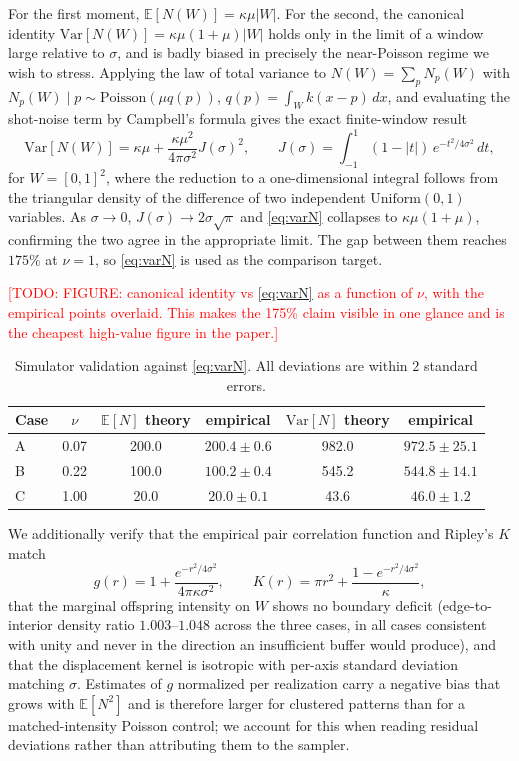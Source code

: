 \documentclass[11pt,letterpaper]{article}
\newcommand{\1}{\mathds{1}}
\newcommand{\todo}[1]{\textcolor{red}{[TODO: #1]}}
\newcommand{\todo}[1]{}
\theoremstyle{plain}
\theoremstyle{definitioncolon}
\begin{document}
For the first moment, $\mathbb{E}[N(W)] = \kappa\mu|W|$. For the second, the
canonical identity $\mathrm{Var}[N(W)] = \kappa\mu(1+\mu)|W|$ holds only in the
limit of a window large relative to $\sigma$, and is badly biased in precisely
the near-Poisson regime we wish to stress. Applying the law of total variance to
$N(W) = \sum_p N_p(W)$ with
$N_p(W) \mid p \sim \mathrm{Poisson}(\mu q(p))$, $q(p) = \int_W k(x-p)\,dx$, and
evaluating the shot-noise term by Campbell's formula gives the exact
finite-window result
    \begin{equation}
    \label{eq:varN}
    \mathrm{Var}[N(W)] = \kappa\mu + \frac{\kappa\mu^2}{4\pi\sigma^2}J(\sigma)^2,
    \qquad
    J(\sigma) = \int_{-1}^{1}(1-|t|)\,e^{-t^2/4\sigma^2}\,dt,
    \end{equation}
for $W = [0,1]^2$, where the reduction to a one-dimensional integral follows from
the triangular density of the difference of two independent
$\mathrm{Uniform}(0,1)$ variables. As $\sigma \to 0$,
$J(\sigma) \to 2\sigma\sqrt{\pi}$ and \eqref{eq:varN} collapses to
$\kappa\mu(1+\mu)$, confirming the two agree in the appropriate limit. The gap
between them reaches $175\%$ at $\nu = 1$, so \eqref{eq:varN} is used as the
comparison target.

\todo{FIGURE: canonical identity vs \eqref{eq:varN} as a function of $\nu$, with
the empirical points overlaid. This makes the 175\% claim visible in one glance
and is the cheapest high-value figure in the paper.}

\begin{table}[h]
\centering
\begin{tabular}{lccccc}
\toprule
Case & $\nu$ & $\mathbb{E}[N]$ theory & empirical
     & $\mathrm{Var}[N]$ theory & empirical \\
\midrule
A & 0.07 & 200.0 & $200.4 \pm 0.6$ & 982.0 & $972.5 \pm 25.1$ \\
B & 0.22 & 100.0 & $100.2 \pm 0.4$ & 545.2 & $544.8 \pm 14.1$ \\
C & 1.00 & 20.0  & $20.0 \pm 0.1$  & 43.6  & $46.0 \pm 1.2$ \\
\bottomrule
\end{tabular}
\caption{Simulator validation against \eqref{eq:varN}. All deviations are within
$2$ standard errors.}
\label{tab:sim-validation}
\end{table}

We additionally verify that the empirical pair correlation function and Ripley's
$K$ match
    \[
    g(r) = 1 + \frac{e^{-r^2/4\sigma^2}}{4\pi\kappa\sigma^2},
    \qquad
    K(r) = \pi r^2 + \frac{1 - e^{-r^2/4\sigma^2}}{\kappa},
    \]
that the marginal offspring intensity on $W$ shows no boundary deficit
(edge-to-interior density ratio $1.003$--$1.048$ across the three cases, in all
cases consistent with unity and never in the direction an insufficient buffer
would produce), and that the displacement kernel is isotropic with per-axis
standard deviation matching $\sigma$. Estimates of $g$ normalized per realization
carry a negative bias that grows with $\mathbb{E}[N^2]$ and is therefore larger
for clustered patterns than for a matched-intensity Poisson control; we account
for this when reading residual deviations rather than attributing them to the
sampler.
\end{document}
